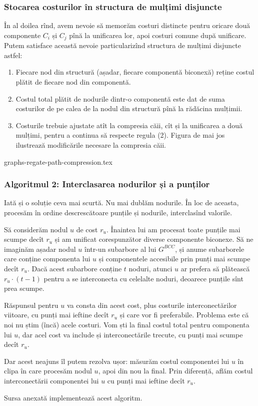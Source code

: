 \documentclass[../main.tex]{subfiles}
\begin{document}
\subsubsection*{Stocarea costurilor în structura de mulțimi disjuncte}

În al doilea rînd, avem nevoie să memorăm costuri distincte pentru oricare două componente $C_i$ și $C_j$ pînă la unificarea lor, apoi costuri comune după unificare. Putem satisface această nevoie particularizînd structura de mulțimi disjuncte astfel:

\begin{enumerate}
  \item Fiecare nod din structură (așadar, fiecare componentă biconexă) reține costul plătit de fiecare nod din componentă.

  \item Costul total plătit de nodurile dintr-o componentă este dat de suma costurilor de pe calea de la nodul din structură pînă la rădăcina mulțimii.

  \item Costurile trebuie ajustate atît la compresia căii, cît și la unificarea a două mulțimi, pentru a continua să respecte regula (2). Figura de mai jos ilustrează modificările necesare la compresia căii.
\end{enumerate}

{graphs-regate-path-compression.tex}

\subsubsection*{Algoritmul 2: Interclasarea nodurilor și a punților}

Iată și o soluție ceva mai scurtă. Nu mai dublăm nodurile. În loc de aceasta, procesăm în ordine descrescătoare punțile și nodurile, interclasînd valorile.

Să considerăm nodul $u$ de cost $r_u$. Înaintea lui am procesat toate punțile mai scumpe decît $r_u$ și am unificat corespunzător diverse componente biconexe. Să ne imaginăm așadar nodul $u$ într-un subarbore al lui $G^{BCC}$, și anume subarborele care conține componenta lui $u$ și componentele accesibile prin punți mai scumpe decît $r_u$. Dacă acest subarbore conține $t$ noduri, atunci $u$ ar prefera să plătească $r_u \cdot (t - 1)$ pentru a se interconecta cu celelalte noduri, deoarece punțile sînt prea scumpe.

Răspunsul pentru $u$ va consta din acest cost, plus costurile interconectărilor viitoare, cu punți mai ieftine decît $r_u$ și care vor fi preferabile. Problema este că noi nu știm (încă) acele costuri. Vom ști la final costul total pentru componenta lui $u$, dar acel cost va include și interconectările trecute, cu punți mai scumpe decît $r_u$.

Dar acest neajuns îl putem rezolva ușor: măsurăm costul componentei lui $u$ în clipa în care procesăm nodul $u$, apoi din nou la final. Prin diferență, aflăm costul interconectării componentei lui $u$ cu punți mai ieftine decît $r_u$.

Sursa anexată implementează acest algoritm.
\end{document}
